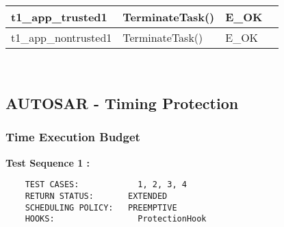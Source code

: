 \documentclass[10pt]{article}
\newlength{\Li}\settowidth{\Li}{Running}
\newlength{\Lii}\setlength{\Lii}{7cm}
\newlength{\Liiii}\setlength{\Liiii}{0.9cm}
\newlength{\Liii}\setlength{\Liii}{\textwidth} \addtolength{\Liii}{-\Li} \addtolength{\Liii}{-\Lii} \addtolength{\Liii}{-\Liiii}
\begin{document}
\begin{supertabular}{|p{\Li}|p{\Lii}|p{\Liii}|p{\Liiii}|}
	t1\_app\_trusted1		& TerminateTask()										& E\_OK											& \\ \hline
	t1\_app\_nontrusted1	& TerminateTask()										& E\_OK											& \\ \hline
	\end{supertabular}\\



\subsection{AUTOSAR - Timing Protection}
\subsubsection{Time Execution Budget}

	\textbf{Test Sequence 1 :}
	\begin{lstlisting}
	TEST CASES:		       1, 2, 3, 4
	RETURN STATUS:	  	 EXTENDED
	SCHEDULING POLICY:   PREEMPTIVE
	HOOKS:		           ProtectionHook
	\end{lstlisting}
	
\end{document}
